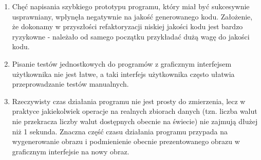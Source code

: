 \documentclass[a4paper,12pt]{article}
\begin{document}
\begin{enumerate}
\item Chęć napisania szybkiego prototypu programu, który miał być sukcesywnie usprawniany, wpłynęła negatywnie na jakość generowanego kodu. Założenie, że dokonamy w przyszłości refaktoryzacji niskiej jakości kodu jest bardzo ryzykowne - należało od samego początku przykładać dużą wagę do jakości kodu.
\item Pisanie testów jednostkowych do programów z graficznym interfejsem użytkownika nie jest łatwe, a taki interfejs użytkownika często ułatwia przeprowadzanie testów manualnych.
\item Rzeczywisty czas działania programu nie jest prosty do zmierzenia, lecz w praktyce jakiekolwiek operacje na realnych zbiorach danych (tzn. liczba walut nie przekracza liczby walut dostępnych obecnie na świecie) nie zajmują dłużej niż 1 sekunda. Znaczna część czasu działania programu przypada na wygenerowanie obrazu i podmienienie obecnie prezentowanego obrazu w graficznym interfejsie na nowy obraz.

\end{enumerate}
\end{document}
